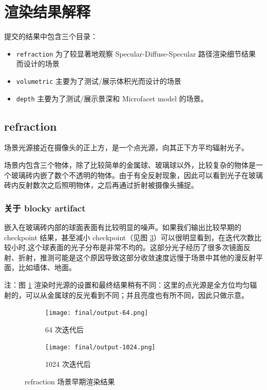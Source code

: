 \documentclass{ctexart}
\begin{document}
\section{渲染结果解释}
提交的结果中包含三个目录：
\begin{itemize}
  \item \texttt{refraction} 为了较显著地观察 Specular-Diffuse-Specular 路径渲染细节结果而设计的场景
  \item \texttt{volumetric} 主要为了测试/展示体积光而设计的场景
  \item \texttt{depth} 主要为了测试/展示景深和 Microfacet model 的场景。
\end{itemize}

\subsection{refraction}
场景光源接近在摄像头的正上方，是一个点光源，向其正下方平均辐射光子。

场景内包含三个物体，除了比较简单的金属球、玻璃球以外，比较复杂的物体是一个玻璃砖内嵌了数个不透明的物体。由于有全反射现象，因此可以看到光子在玻璃砖内反射数次之后照明物体，之后再通过折射被摄像头捕捉。

\subsubsection{关于 blocky artifact}
嵌入在玻璃砖内部的球面表面有比较明显的噪声。如果我们输出比较早期的 checkpoint 结果，甚至减小 checkpoint（见图 \ref{fig:refraction-early}）可以很明显看到，在迭代次数比较小时,这个球表面的光子分布是非常不均的。这部分光子经历了很多次镜面反射、折射，推测可能是这个原因导致这部分收敛速度远慢于场景中其他的漫反射平面，比如墙体、地面。

注：图 \ref{fig:64} 渲染时光源的设置和最终结果稍有不同：这里的点光源是全方位均匀辐射的，可以从金属球的反光看到不同；并且亮度也有所不同，因此只做示意。

\begin{figure}[ht]
  \centering
  \begin{subfigure}{.45\textwidth}
    \centering
    \texttt{[image: final/output-64.png]}
    \caption{64 次迭代后}
    \label{fig:64}
  \end{subfigure}
  \begin{subfigure}{.45\textwidth}
    \centering
    \texttt{[image: final/output-1024.png]}
    \caption{1024 次迭代后}
    \label{fig:1024}
  \end{subfigure}
  \caption{refraction 场景早期渲染结果}
  \label{fig:refraction-early}
\end{figure}
\end{document}
